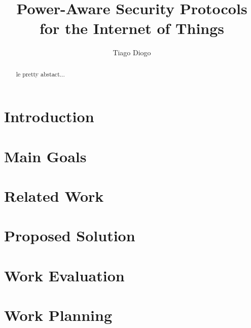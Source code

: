 \documentclass{llncs}
\begin{document}
\title{Power-Aware Security Protocols\\ for the Internet of Things}
%
\titlerunning{}  %
%
\author{Tiago Diogo}
%
%
%

\maketitle              %

\begin{abstract}
le pretty abstact...
\end{abstract}

\tableofcontents
\newpage

\section{Introduction}


\section{Main Goals}


\section{Related Work}


\section{Proposed Solution}


\section{Work Evaluation}


\section{Work Planning}

\end{document}
